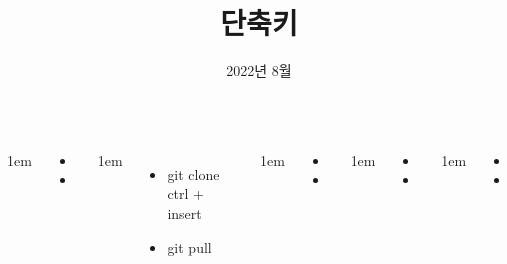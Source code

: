 \documentclass[	20pt, 
							a1paper, 
							portrait, %
							margin=0mm, %
							innermargin=10mm,  		%
							colspace=5mm, 
							subcolspace=0mm
							]{tikzposter}
\title{단축키}
\author{ 2022년 8월 }
\begin{document}
	\maketitle

	\begin{columns}


			{
					\setlength{\leftmargini}{7em}
					\setlength{\labelsep} {1em}
				\begin{LARGE}
					\begin{itemize}
					\item 
					\item 
					\end{itemize}
				\end{LARGE}
			}

			{
					\setlength{\leftmargini}{7em}
					\setlength{\labelsep} {1em}
					\begin{itemize}
					\item git clone ctrl + insert
					\item git pull
					\end{itemize}
			}

			{
					\setlength{\leftmargini}{7em}
					\setlength{\labelsep} {1em}
				\begin{LARGE}
					\begin{itemize}
					\item 
					\item 
					\end{itemize}
				\end{LARGE}
			}


			{
					\setlength{\leftmargini}{4em}
					\setlength{\labelsep} {1em}
				\begin{LARGE}
					\begin{itemize}
					\item 
					\item 
					\end{itemize}
				\end{LARGE}
			}



			{
					\setlength{\leftmargini}{4em}
					\setlength{\labelsep} {1em}
				\begin{LARGE}
					\begin{itemize}
					\item 
					\item 
					\end{itemize}
				\end{LARGE}
			}



\end{columns}
\end{document}
